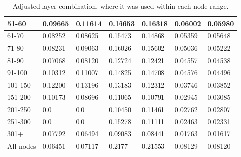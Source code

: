 \begin{table*}[h!]
\begin{tabular}{|l|l|l||l|l||l|l|}
        51-60     & 0.09665                                 & 0.11614                        & 0.16653                          & 0.16318          & 0.06002       & 0.05980          \\ \hline
        61-70     & 0.08252                                 & 0.08625                        & 0.15473                          & 0.14868          & 0.05359       & 0.05648          \\ \hline
        71-80     & 0.08231                                 & 0.09063                        & 0.16026                          & 0.15602          & 0.05036       & 0.05222          \\ \hline
        81-90     & 0.07068                                 & 0.08120                        & 0.12724                          & 0.12421          & 0.04557       & 0.04538          \\ \hline
        91-100    & 0.10312                                 & 0.11007                        & 0.14825                          & 0.14708          & 0.04576       & 0.04496          \\ \hline
        101-150   & 0.12200                                 & 0.13196                        & 0.13183                          & 0.12312          & 0.03746       & 0.03852          \\ \hline
        151-200   & 0.10173                                 & 0.08696                        & 0.11065                          & 0.10791          & 0.02945       & 0.03085          \\ \hline
        201-250   & 0.0                                     & 0.0                            & 0.10450                          & 0.11461          & 0.02762       & 0.02807          \\ \hline
        251-300   & 0.0                                     & 0.0                            & 0.15278                          & 0.11111          & 0.02463       & 0.02331          \\ \hline
        301+      & 0.07792                                 & 0.06494                        & 0.09083                          & 0.08441          & 0.01763       & 0.01617          \\ \hline
        All nodes & 0.06451                                 & 0.07117                        & 0.2177                           & 0.21553          & 0.08129       & 0.08120          \\ \hline
    \end{tabular}
    \caption{Adjusted layer combination, where it was used within each node range.}
    \label{tab:ALC-degree-based-recall}
\end{table*}

